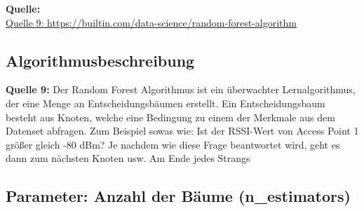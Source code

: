 \textbf{Quelle:} \\
\href{https://builtin.com/data-science/random-forest-algorithm}{Quelle 9: https://builtin.com/data-science/random-forest-algorithm}

\subsection{Algorithmusbeschreibung}
\textbf{Quelle 9:} Der Random Forest Algorithmus ist ein überwachter Lernalgorithmus, der eine Menge an Entscheidungsbäumen erstellt. Ein Entscheidungsbaum besteht aus Knoten, welche eine Bedingung zu einem der Merkmale aus dem Datenset abfragen. Zum Beispiel sowas wie: Ist der RSSI-Wert von Access Point 1 größer gleich -80 dBm? Je nachdem wie diese Frage beantwortet wird, geht es dann zum nächsten Knoten usw. Am Ende jedes Strangs

\subsection{Parameter: Anzahl der Bäume (n\_estimators)}
